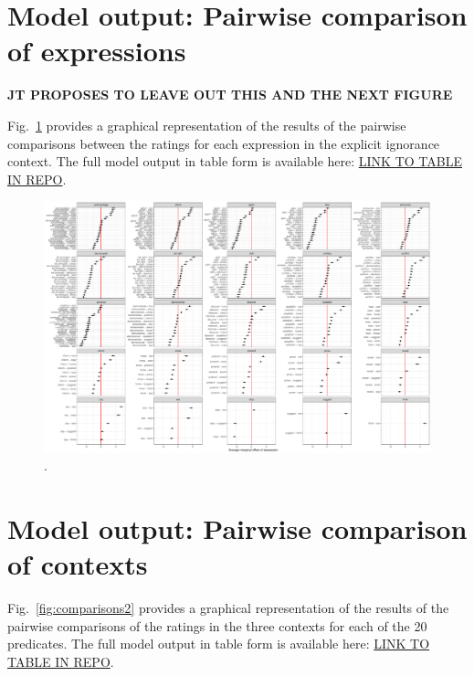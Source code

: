 \documentclass[11pt,fleqn]{article}
\newcommand{\6}{\mbox{$[\hspace*{-.6mm}[$}}
\newcommand{\9}{\mbox{$]\hspace*{-.6mm}]$}}
\begin{document}
\section{Model output: Pairwise comparison of expressions}\label{a:analysis1}

{\bf JT PROPOSES TO LEAVE OUT THIS AND THE NEXT FIGURE}

Fig.~\ref{fig:comparisons1} provides a graphical representation of the results of the pairwise comparisons between the ratings for each expression in the explicit ignorance context. The full model output in table form is available here: \url{LINK TO TABLE IN REPO}.

\begin{figure}
\centering
\includegraphics[width=\textwidth]{../../results/main/13explicitIgnorance/graphs/comparisons-in-EIC}
\caption{.}\label{fig:comparisons1}
\end{figure}

\section{Model output: Pairwise comparison of contexts}\label{a:analysis2}

Fig.~\ref{fig:comparisons2} provides a graphical representation of the results of the pairwise comparisons of the ratings in the three contexts for each of the 20 predicates. The full model output in table form is available here: \url{LINK TO TABLE IN REPO}.
\end{document}
